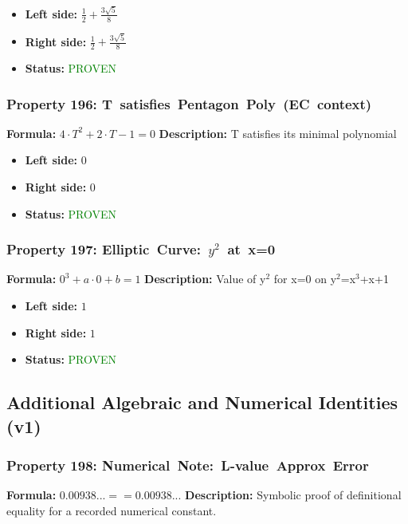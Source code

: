 \begin{itemize}
\item \textbf{Left side:} $\frac{1}{2} + \frac{3 \sqrt{5}}{8}$
\item \textbf{Right side:} $\frac{1}{2} + \frac{3 \sqrt{5}}{8}$
\item \textbf{Status:} \textcolor{green}{PROVEN}
\end{itemize}

\subsubsection*{Property 196: T~satisfies~Pentagon~Poly~(EC~context)}
\textbf{Formula:} $4 \cdot T^2 + 2 \cdot T - 1 = 0$
\textbf{Description:} T satisfies its minimal polynomial

\begin{itemize}
\item \textbf{Left side:} $0$
\item \textbf{Right side:} $0$
\item \textbf{Status:} \textcolor{green}{PROVEN}
\end{itemize}

\subsubsection*{Property 197: Elliptic~Curve:~$y^{2}$~at~x=0}
\textbf{Formula:} $0^3 + a \cdot 0 + b = 1$
\textbf{Description:} Value of y$^2$ for x=0 on y$^2$=x$^3$+x+1

\begin{itemize}
\item \textbf{Left side:} $1$
\item \textbf{Right side:} $1$
\item \textbf{Status:} \textcolor{green}{PROVEN}
\end{itemize}


\subsection{Additional Algebraic and Numerical Identities (v1)}

\subsubsection*{Property 198: Numerical~Note:~L-value~Approx~Error}
\textbf{Formula:} $0.00938... == 0.00938...$
\textbf{Description:} Symbolic proof of definitional equality for a recorded numerical constant.

